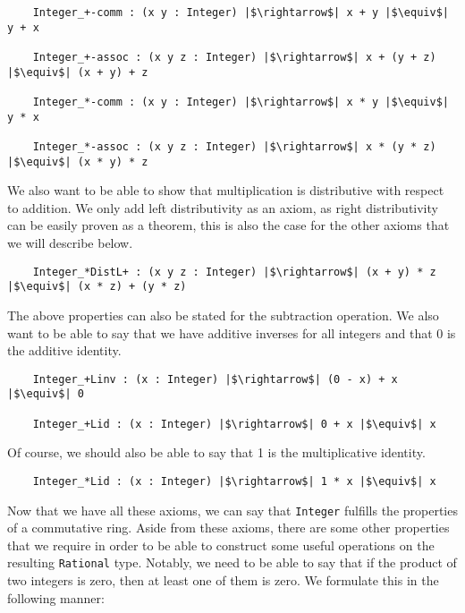 \documentclass[12pt,twoside,maitrise]{dms}
\theoremstyle{definition}
\numberwithin{equation}{section}
\numberwithin{table}{chapter}
\numberwithin{figure}{chapter}
\newcommand\id[1] {\texttt{#1}}
\begin{document}
\begin{verbatim}
    Integer_+-comm : (x y : Integer) |$\rightarrow$| x + y |$\equiv$| y + x

    Integer_+-assoc : (x y z : Integer) |$\rightarrow$| x + (y + z) |$\equiv$| (x + y) + z

    Integer_*-comm : (x y : Integer) |$\rightarrow$| x * y |$\equiv$| y * x

    Integer_*-assoc : (x y z : Integer) |$\rightarrow$| x * (y * z) |$\equiv$| (x * y) * z
\end{verbatim}

We also want to be able to show that multiplication is distributive with respect
to addition. We only add left distributivity as an axiom, as right
distributivity can be easily proven as a theorem, this is also the case for the
other axioms that we will describe below.

\begin{verbatim}
    Integer_*DistL+ : (x y z : Integer) |$\rightarrow$| (x + y) * z |$\equiv$| (x * z) + (y * z)
\end{verbatim}

The above properties can also be stated for the subtraction operation. We also
want to be able to say that we have additive inverses for all integers and that
0 is the additive identity.

\begin{verbatim}
    Integer_+Linv : (x : Integer) |$\rightarrow$| (0 - x) + x |$\equiv$| 0

    Integer_+Lid : (x : Integer) |$\rightarrow$| 0 + x |$\equiv$| x
\end{verbatim}

Of course, we should also be able to say that 1 is the multiplicative identity.

\begin{verbatim}
    Integer_*Lid : (x : Integer) |$\rightarrow$| 1 * x |$\equiv$| x
\end{verbatim}

Now that we have all these axioms, we can say that \id{Integer} fulfills the
properties of a commutative ring. Aside from these axioms, there are some other
properties that we require in order to be able to construct some useful
operations on the resulting \id{Rational} type. Notably, we need to be able to
say that if the product of two integers is zero, then at least one of them is
zero. We formulate this in the following manner:
\end{document}
